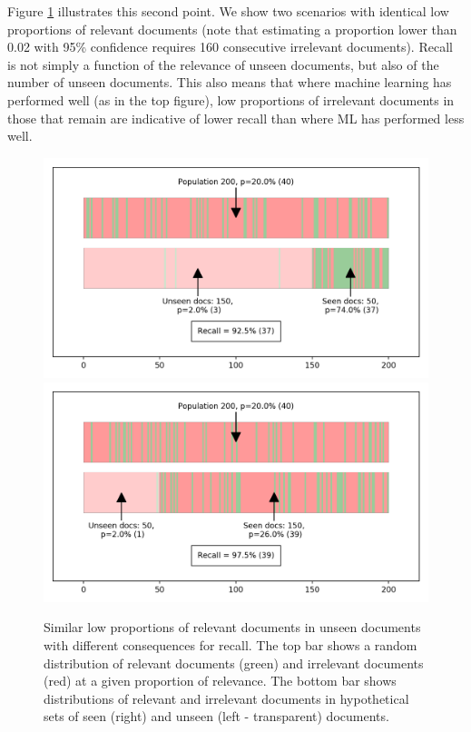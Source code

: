 \documentclass{bmcart}
\begin{document}
Figure \ref{unseen-proportions} illustrates this second point. 
We show two scenarios with identical low proportions of relevant documents (note that estimating a proportion lower than 0.02 with 95\% confidence requires 160 consecutive irrelevant documents). 
Recall is not simply a function of the relevance of unseen documents, but also of the number of unseen documents. 
This also means that where machine learning has performed well (as in the top figure), low proportions of irrelevant documents in those that remain are indicative of lower recall than where ML has performed less well.

\begin{figure}
	\includegraphics[width=\linewidth]{../images/proportions_1.png}
	\includegraphics[width=\linewidth]{../images/proportions_2.png}
	\caption{Similar low proportions of relevant documents in unseen documents with different consequences for recall. The top bar shows a random distribution of relevant documents (green) and irrelevant documents (red) at a given proportion of relevance. The bottom bar  shows distributions of relevant and irrelevant documents in hypothetical sets of seen (right) and unseen (left - transparent) documents.}
	\label{unseen-proportions}
\end{figure}
\end{document}

